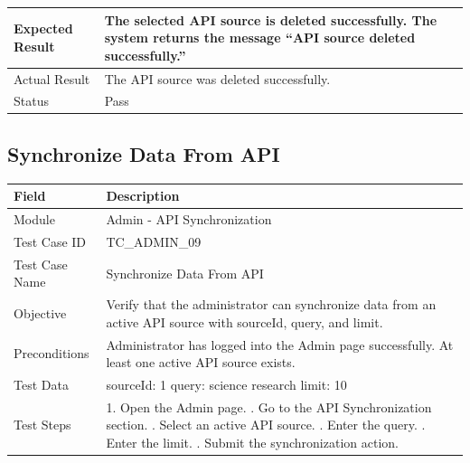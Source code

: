 \documentclass[12pt,a4paper]{article}
\begin{document}
{{\begin{longtable}{|p{4cm}|p{10cm}|}
	Expected Result &
	The selected API source is deleted successfully. The system returns the message ``API source deleted successfully.'' \\ \hline
	
	Actual Result &
	The API source was deleted successfully. \\ \hline
	
	Status & Pass \\ \hline
	
\end{longtable}
\subsection{Synchronize Data From API}
\begin{longtable}{|p{4cm}|p{10cm}|}
	\hline
	\textbf{Field} & \textbf{Description} \\ \hline
	
	Module & Admin - API Synchronization \\ \hline
	
	Test Case ID & TC\_ADMIN\_09 \\ \hline
	
	Test Case Name & Synchronize Data From API \\ \hline
	
	Objective &
	Verify that the administrator can synchronize data from an active API source with sourceId, query, and limit. \\ \hline
	
	Preconditions &
	Administrator has logged into the Admin page successfully. \newline
	At least one active API source exists.
	\\ \hline
	
	Test Data &
	sourceId: 1 \newline
	query: science research \newline
	limit: 10
	\\ \hline
	
	Test Steps &
	1. Open the Admin page. \newline
	2. Go to the API Synchronization section. \newline
	3. Select an active API source. \newline
	4. Enter the query. \newline
	5. Enter the limit. \newline
	6. Submit the synchronization action.
	\\ \hline
	

\end{longtable}}}
\end{document}
